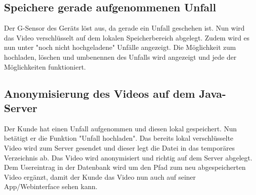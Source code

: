\subsection{Speichere gerade aufgenommenen Unfall}
Der G-Sensor des Ger\"ats l\"ost aus, da gerade ein Unfall geschehen ist. Nun wird das Video verschl\"usselt auf dem lokalen Speicherbereich abgelegt. Zudem wird es nun unter "noch nicht hochgeladene" Unf\"alle angezeigt. Die M\"oglichkeit zum hochladen, l\"oschen und umbenennen des Unfalls wird angezeigt und jede der M\"oglichkeiten funktioniert.

\subsection{Anonymisierung des Videos auf dem Java-Server}
Der Kunde hat einen Unfall aufgenommen und diesen lokal gespeichert. Nun bet\"atigt er die Funktion "Unfall hochladen". Das bereits lokal verschl\"usselte Video wird zum Server gesendet und dieser legt die Datei in das tempor\"ares Verzeichnis ab. Das Video wird anonymisiert und richtig auf dem Server abgelegt. Dem Usereintrag in der Datenbank wird um den Pfad zum neu abgespeicherten Video erg\"anzt, damit der Kunde das Video nun auch auf seiner App/Webinterface sehen kann.
